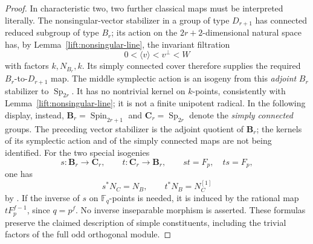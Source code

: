 \begin{proof}
In characteristic two, two further classical maps must be interpreted
literally.  The nonsingular-vector stabilizer in a group of type
$D_{r+1}$ has connected reduced subgroup of type $B_r$; its action on
the $2r+2$-dimensional natural space has, by
Lemma~\ref{lift:nonsingular-line}, the invariant filtration
\[
 0<\langle v\rangle<v^\perp<W
\]
with factors $k,N_{B_r},k$.  Its simply connected cover therefore
supplies the required $B_r$-to-$D_{r+1}$ map.  The middle symplectic
action is an isogeny from this \emph{adjoint} $B_r$ stabilizer to
$\operatorname{Sp}_{2r}$.  It has no nontrivial
kernel on $k$-points, consistently with
Lemma~\ref{lift:nonsingular-line}; it is not a finite unipotent
radical.  In the following display, instead,
$\mathbf B_r=\operatorname{Spin}_{2r+1}$ and
$\mathbf C_r=\operatorname{Sp}_{2r}$ denote the \emph{simply
connected} groups.  The preceding vector stabilizer is the adjoint
quotient of $\mathbf B_r$; the kernels of its symplectic action and
of the simply connected maps are not being identified.  For the two
special isogenies
\[
 s:\mathbf B_r\longrightarrow\mathbf C_r,
 \qquad t:\mathbf C_r\longrightarrow\mathbf B_r,
 \qquad st=F_p,\quad ts=F_p,
\]
one has
\[
 s^*N_C=N_B,\qquad t^*N_B=N_C^{[1]}
\]
by \cite[author preprint, \S I.3.2]{DowdSin1996}.
If the inverse of $s$ on $\mathbb F_q$-points is needed, it is induced
by the rational map $tF_p^{f-1}$, since $q=p^f$.  No inverse
inseparable morphism is asserted.  These formulas preserve the
claimed description of simple constituents, including the trivial
factors of the full odd orthogonal module.


\end{proof}
